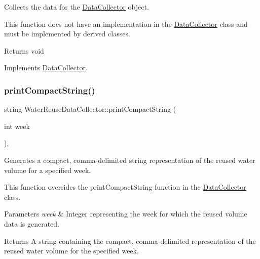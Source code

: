 Collects the data for the \mbox{\hyperlink{classDataCollector}{Data\+Collector}} object. 

This function does not have an implementation in the \mbox{\hyperlink{classDataCollector}{Data\+Collector}} class and must be implemented by derived classes.

\begin{DoxyReturn}{Returns}
void 
\end{DoxyReturn}


Implements \mbox{\hyperlink{classDataCollector_a01486bf58acbe37b203f97b3b9a79c40}{Data\+Collector}}.

\mbox{\label{classWaterReuseDataCollector_a6b37aa4b2031cf0a1a1326da2bd64420}} 
\subsubsection{\texorpdfstring{print\+Compact\+String()}{printCompactString()}}
{\footnotesize\ttfamily string Water\+Reuse\+Data\+Collector\+::print\+Compact\+String (\begin{DoxyParamCaption}\item[{int}]{week }\end{DoxyParamCaption})\hspace{0.3cm}{\ttfamily [override]}, {\ttfamily [virtual]}}



Generates a compact, comma-\/delimited string representation of the reused water volume for a specified week. 

This function overrides the {\ttfamily print\+Compact\+String} function in the {\ttfamily \mbox{\hyperlink{classDataCollector}{Data\+Collector}}} class.


\begin{DoxyParams}{Parameters}
{\em week} & Integer representing the week for which the reused volume data is generated.\\
\hline
\end{DoxyParams}
\begin{DoxyReturn}{Returns}
A string containing the compact, comma-\/delimited representation of the reused water volume for the specified week. 
\end{DoxyReturn}


